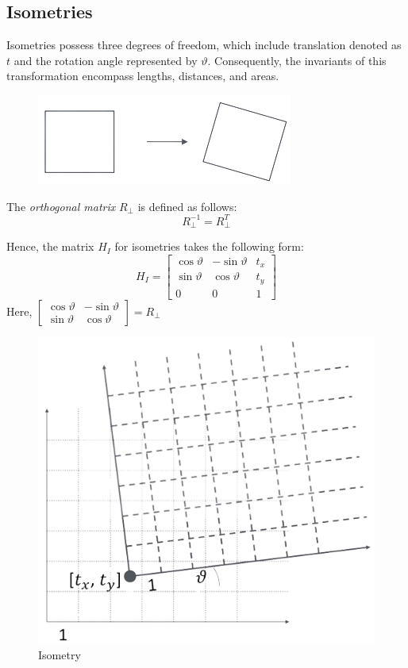 \subsection{Isometries}
Isometries possess three degrees of freedom, which include translation denoted as $t$ and the rotation angle represented by $\vartheta$. 
Consequently, the invariants of this transformation encompass lengths, distances, and areas.
\begin{figure}[H]
    \centering
    \includegraphics[width=0.25\linewidth]{images/isometry.png}
\end{figure}
\begin{definition}
    The \emph{orthogonal matrix} $R_{\perp}$ is defined as follows: 
    \[R_{\perp}^{-1}=R_{\perp}^{T}\]
\end{definition}
Hence, the matrix $H_I$ for isometries takes the following form:
\[H_I=
\begin{bmatrix}
    \cos \vartheta & -\sin \vartheta & t_x \\
    \sin \vartheta & \cos \vartheta & t_y \\
    0 & 0 & 1
\end{bmatrix}\]
Here, $
\begin{bmatrix}
    \cos \vartheta & -\sin \vartheta \\
    \sin \vartheta & \cos \vartheta
\end{bmatrix}
=R_{\perp}$
\begin{figure}[H]
    \centering
    \includegraphics[width=0.25\linewidth]{images/isometry1.png}
    \caption{Isometry}
\end{figure}

